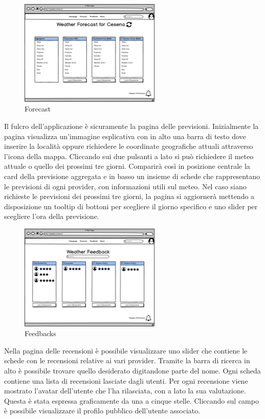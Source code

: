 \begin{figure}[H]
    \caption{Forecast}
    \label{fig:Forecast}
    \centering
    \includegraphics[width=0.6\textwidth]{MockUps/forecast.png}
\end{figure}
Il fulcro dell'applicazione è sicuramente la pagina delle previsioni. Inizialmente la pagina visualizza un'immagine esplicativa con in alto una barra di testo dove inserire la località oppure richiedere le coordinate geografiche attuali attraverso l'icona della mappa. Cliccando sui due pulsanti a lato si può richiedere il meteo attuale o quello dei prossimi tre giorni. Comparirà così in posizione centrale la card della previsione aggregata e in basso un insieme di schede che rappresentano le previsioni di ogni provider, con informazioni utili sul meteo.
 Nel caso siano richieste le previsioni dei prossimi tre giorni, la pagina si aggiornerà mettendo a disposizione un tooltip di bottoni per scegliere il giorno specifico e uno slider per scegliere l'ora della previsione.

\begin{figure}[H]
    \caption{Feedbacks}
    \label{fig:Feedbacks}
    \centering
    \includegraphics[width=0.6\textwidth]{MockUps/feedback.png}
\end{figure}
Nella pagina delle recensioni è possibile visualizzare uno slider che contiene le schede con le recensioni relative ai vari provider. Tramite la barra di ricerca in alto è possibile trovare quello desiderato digitandone parte del nome. Ogni scheda contiene una lista di recensioni lasciate dagli utenti. Per ogni recensione viene mostrato l'avatar dell'utente che l'ha rilasciata, con a lato la sua valutazione. Questa è stata espressa graficamente da una a cinque stelle. Cliccando sul campo è possibile visualizzare il profilo pubblico dell'utente associato.

